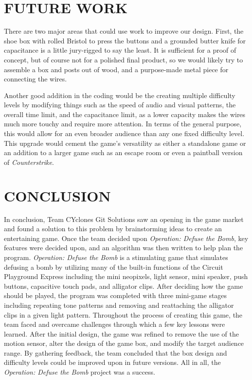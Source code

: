 \documentclass[12pt]{article}
\begin{document}
\section{FUTURE WORK}
There are two major areas that could use work to improve our design. First, the shoe box with rolled Bristol to press the buttons and a grounded butter knife for capacitance is a little jury-rigged to say the least. It is sufficient for a proof of concept, but of course not for a polished final product, so we would likely try to assemble a box and posts out of wood, and a purpose-made metal piece for connecting the wires.

Another good addition in the coding would be the creating multiple difficulty levels by modifying things such as the speed of audio and visual patterns, the overall time limit, and the capacitance limit, as a lower capacity makes the wires much more touchy and require more attention. In terms of the general purpose, this would allow for an even broader audience than any one fixed difficulty level.  This upgrade would cement the game's versatility as either a standalone game or an addition to a larger game such as an escape room or even a paintball version of \textit{Counterstrike}.

\section{CONCLUSION}

In conclusion, Team CYclones Git Solutions saw an opening in the game market and found a solution to this problem by brainstorming ideas to create an entertaining game. Once the team decided upon \textit{Operation: Defuse the Bomb}, key features were decided upon, and an algorithm was then written to help plan the program. \textit{Operation: Defuse the Bomb} is a stimulating game that simulates defusing a bomb by utilizing many of the built-in functions of the Circuit Playground Express including the mini neopixels, light sensor, mini speaker, push buttons, capacitive touch pads, and alligator clips.  After deciding how the game should be played, the program was completed with three mini-game stages including repeating tone patterns and removing and reattaching the alligator clips in a given light pattern.  Throughout the process of creating this game, the team faced and overcame challenges through which a few key lessons were learned.  After the initial design, the game was refined to remove the use of the motion sensor, alter the design of the game box, and modify the target audience range.  By gathering feedback, the team concluded that the box design and difficulty levels could be improved upon in future versions.  All in all, the \textit{Operation: Defuse the Bomb} project was a success.
\end{document}
